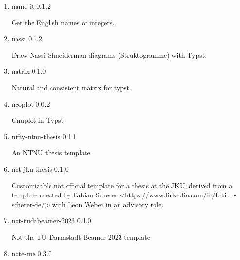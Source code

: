 \begin{enumerate}
  { modpattern } { 0.1.0 }

  Easily create patterns in typst.
\item
  \href{/universe/package/name-it/}{}

  { name-it } { 0.1.2 }

  Get the English names of integers.
\item
  \href{/universe/package/nassi/}{}

  { nassi } { 0.1.2 }

  Draw Nassi-Shneiderman diagrams (Struktogramme) with Typst.
\item
  \href{/universe/package/natrix/}{}

  { natrix } { 0.1.0 }

  Natural and consistent matrix for typst.
\item
  \href{/universe/package/neoplot/}{}

  { neoplot } { 0.0.2 }

  Gnuplot in Typst
\item
  \href{/universe/package/nifty-ntnu-thesis/}{}


  { nifty-ntnu-thesis } { 0.1.1 }

  An NTNU thesis template
\item
  \href{/universe/package/not-jku-thesis/}{}


  { not-jku-thesis } { 0.1.0 }

  Customizable not official template for a thesis at the JKU, derived
  from a template created by Fabian Scherer
  \textless https://www.linkedin.com/in/fabian-scherer-de/\textgreater{}
  with Leon Weber in an advisory role.
\item
  \href{/universe/package/not-tudabeamer-2023/}{}


  { not-tudabeamer-2023 } { 0.1.0 }

  Not the TU Darmstadt Beamer 2023 template
\item
  \href{/universe/package/note-me/}{}

  { note-me } { 0.3.0 }


\end{enumerate}

